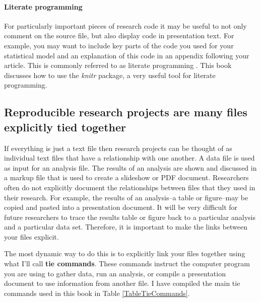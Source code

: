\documentclass[ChapterTOCs,krantz1]{krantz}\usepackage{graphicx, color}
\begin{document}
\paragraph{Literate programming}

For particularly important pieces of research code it may be useful to not only comment on the source file, but also display code in presentation text. For example, you may want to include key parts of the code you used for your statistical model and an explanation of this code in an appendix following your article. This is commonly referred to as literate programming  \cite{Knuth1992}. This book discusses how to use the {\emph{knitr}} package, a very useful tool for literate programming. 

\subsection{Reproducible research projects are many files explicitly tied together}

If everything is just a text file then research projects can be thought of as individual text files that have a relationship with one another. A data file is used as input for an analysis file. The results of an analysis are shown and discussed in a markup file that is used to create a slideshow or PDF document. Researchers often do not explicitly document the relationships between files that they used in their research. For example, the results of an analysis--a table or figure--may be copied and pasted into a presentation document. It will be very difficult for future researchers to trace the results table or figure back to a particular analysis and a particular data set. Therefore, it is important to make the links between your files explicit. 

The most dynamic way to do this is to explicitly link your files together using what I'll call {\bf{tie commands}}.  These commands instruct the computer program you are using to gather data, run an analysis, or compile a presentation document to use information from another file. I have compiled the main tie commands used in this book in Table \ref{TableTieCommands}.
\end{document}

